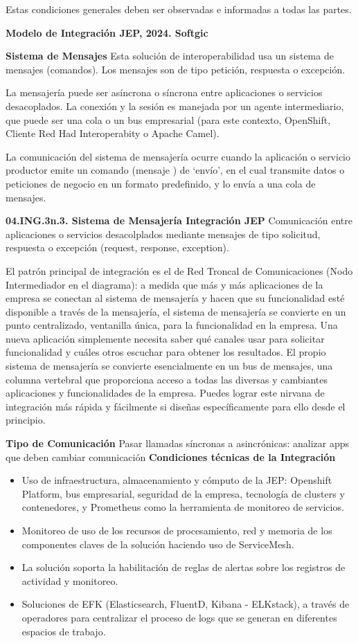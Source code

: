 \documentclass[
  paper=a4,
  ,captions=tableheading
]{scrartcl}
\begin{document}
Estas condiciones generales deben ser observadas e informadas a todas
las partes.

\textbf{Modelo de Integración JEP, 2024. Softgic}

\textbf{Sistema de Mensajes} Esta solución de interoperabilidad usa un
sistema de mensajes (comandos). Los mensajes son de tipo petición,
respuesta o excepción.

La mensajería puede ser asíncrona o síncrona entre aplicaciones o
servicios desacoplados. La conexión y la sesión es manejada por un
agente intermediario, que puede ser una cola o un bus empresarial (para
este contexto, OpenShift, Cliente Red Had Interoperabity o Apache
Camel).

La comunicación del sistema de mensajería ocurre cuando la aplicación o
servicio productor emite un comando (mensaje ) de `envío', en el cual
transmite datos o peticiones de negocio en un formato predefinido, y lo
envía a una cola de mensajes.

\textbf{04.ING.3n.3. Sistema de Mensajería Integración JEP} Comunicación
entre aplicaciones o servicios desacolplados mediante mensajes de tipo
solicitud, respuesta o excepción (request, response, exception).

El patrón principal de integración es el de Red Troncal de
Comunicaciones (Nodo Intermediador en el diagrama): a medida que más y
más aplicaciones de la empresa se conectan al sistema de mensajería y
hacen que su funcionalidad esté disponible a través de la mensajería, el
sistema de mensajería se convierte en un punto centralizado, ventanilla
única, para la funcionalidad en la empresa. Una nueva aplicación
simplemente necesita saber qué canales usar para solicitar funcionalidad
y cuáles otros escuchar para obtener los resultados. El propio sistema
de mensajería se convierte esencialmente en un bus de mensajes, una
columna vertebral que proporciona acceso a todas las diversas y
cambiantes aplicaciones y funcionalidades de la empresa. Puedes lograr
este nirvana de integración más rápida y fácilmente si diseñas
específicamente para ello desde el principio.

\textbf{Tipo de Comunicación} Pasar llamadas síncronas a asincrónicas:
analizar apps que deben cambiar comunicación \textbf{Condiciones
técnicas de la Integración}

\begin{itemize}
\item
  Uso de infraestructura, almacenamiento y cómputo de la JEP: Openshift
  Platform, bus empresarial, seguridad de la empresa, tecnología de
  clusters y contenedores, y Prometheus como la herramienta de monitoreo
  de servicios.
\item
  Monitoreo de uso de los recursos de procesamiento, red y memoria de
  los componentes claves de la solución haciendo uso de ServiceMesh.
\item
  La solución soporta la habilitación de reglas de alertas sobre los
  registros de actividad y monitoreo.
\item
  Soluciones de EFK (Elasticsearch, FluentD, Kibana - ELKstack), a
  través de operadores para centralizar el proceso de logs que se
  generan en diferentes espacios de trabajo.
\end{itemize}
\end{document}
